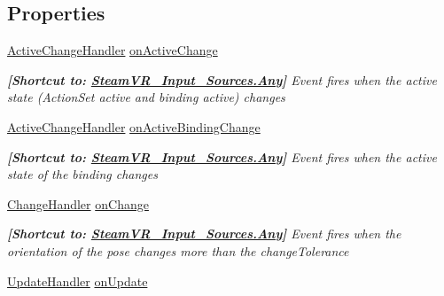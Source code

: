 \subsection*{Properties}
\begin{DoxyCompactItemize}
\item 
\mbox{\hyperlink{class_valve_1_1_v_r_1_1_steam_v_r___action___pose_a3861a4b4b8ce246db2cc77e632a7f999}{Active\+Change\+Handler}} \mbox{\hyperlink{class_valve_1_1_v_r_1_1_steam_v_r___action___pose_ae7a4fdfdb1267a24cd889cd2b017da31}{on\+Active\+Change}}
\begin{DoxyCompactList}\small\item\em {\bfseries{\mbox{[}Shortcut to\+: \mbox{\hyperlink{namespace_valve_1_1_v_r_a82e5bf501cc3aa155444ee3f0662853faed36a1ef76a59ee3f15180e0441188ad}{Steam\+V\+R\+\_\+\+Input\+\_\+\+Sources.\+Any}}\mbox{]}}} Event fires when the active state (Action\+Set active and binding active) changes \end{DoxyCompactList}\item 
\mbox{\hyperlink{class_valve_1_1_v_r_1_1_steam_v_r___action___pose_a3861a4b4b8ce246db2cc77e632a7f999}{Active\+Change\+Handler}} \mbox{\hyperlink{class_valve_1_1_v_r_1_1_steam_v_r___action___pose_aba7e873fc9c7c419b9ed3f8bef4ddb42}{on\+Active\+Binding\+Change}}
\begin{DoxyCompactList}\small\item\em {\bfseries{\mbox{[}Shortcut to\+: \mbox{\hyperlink{namespace_valve_1_1_v_r_a82e5bf501cc3aa155444ee3f0662853faed36a1ef76a59ee3f15180e0441188ad}{Steam\+V\+R\+\_\+\+Input\+\_\+\+Sources.\+Any}}\mbox{]}}} Event fires when the active state of the binding changes \end{DoxyCompactList}\item 
\mbox{\hyperlink{class_valve_1_1_v_r_1_1_steam_v_r___action___pose_ac9415e6ad971e70311f59ff1bfb4ea76}{Change\+Handler}} \mbox{\hyperlink{class_valve_1_1_v_r_1_1_steam_v_r___action___pose_a7728910e1c7e84dabcb1c279ba81104f}{on\+Change}}
\begin{DoxyCompactList}\small\item\em {\bfseries{\mbox{[}Shortcut to\+: \mbox{\hyperlink{namespace_valve_1_1_v_r_a82e5bf501cc3aa155444ee3f0662853faed36a1ef76a59ee3f15180e0441188ad}{Steam\+V\+R\+\_\+\+Input\+\_\+\+Sources.\+Any}}\mbox{]}}} Event fires when the orientation of the pose changes more than the change\+Tolerance \end{DoxyCompactList}\item 
\mbox{\hyperlink{class_valve_1_1_v_r_1_1_steam_v_r___action___pose_a243e7046a430c572e5be3d1b6b322b6d}{Update\+Handler}} \mbox{\hyperlink{class_valve_1_1_v_r_1_1_steam_v_r___action___pose_a3a642708b4ec292d5d30e701eac7c41d}{on\+Update}}

\end{DoxyCompactItemize}
